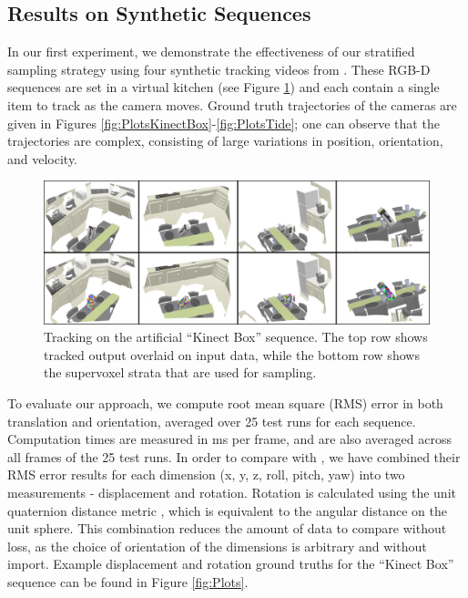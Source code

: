 \subsection{Results on Synthetic Sequences}
In our first experiment, we demonstrate the effectiveness of our stratified sampling strategy using four synthetic tracking videos from \cite{Choi_IROS2013}. These RGB-D sequences are set in a virtual kitchen (see Figure \ref{fig:KinectBoxMontage}) and each contain a single item to track as the camera moves. Ground truth trajectories of the cameras are given in Figures \ref{fig:PlotsKinectBox}-\ref{fig:PlotsTide}; one can observe that the trajectories are complex, consisting of large variations in position, orientation, and velocity.  

\begin{figure}[!ht]
  \centering
  \includegraphics[width=\linewidth]{figures/Tracking/KinectBoxSVMontage.pdf}
  \caption[Tracking on the artificial ``Kinect Box'' sequence.]{Tracking on the artificial ``Kinect Box'' sequence. The top row shows tracked output overlaid on input data, while the bottom row shows the supervoxel strata that are used for sampling.}
  \label{fig:KinectBoxMontage}
\end{figure}


To evaluate our approach, we compute root mean square (RMS) error in both translation and orientation, averaged over 25 test runs for each sequence. Computation times are measured in ms per frame, and are also averaged across all frames of the 25 test runs. In order to compare with \cite{Choi_IROS2013}, we have combined their RMS error results for each dimension (x, y, z, roll, pitch, yaw) into two measurements - displacement and rotation. Rotation is calculated using the unit quaternion distance metric \cite{Kuffner_ICRA2004}, which is equivalent to the angular distance on the unit sphere. This combination reduces the amount of data to compare without loss, as the choice of orientation of the dimensions is arbitrary and without import. Example displacement and rotation ground truths for the ``Kinect Box'' sequence can be found in Figure \ref{fig:Plots}.

